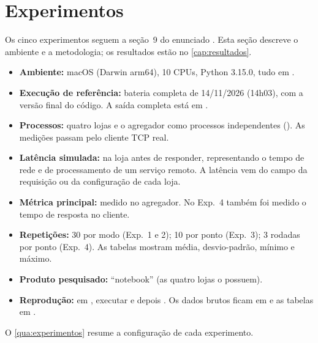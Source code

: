 \chapter{Experimentos}\label{cap:experimentos}

Os cinco experimentos seguem a seção~9 do enunciado \cite{enunciado2026}. Esta seção descreve o ambiente e a metodologia; os resultados estão no \autoref{cap:resultados}.

\begin{itemize}
  \item \textbf{Ambiente:} macOS (Darwin arm64), 10 CPUs, Python 3.15.0, tudo em .
  \item \textbf{Execução de referência:} bateria completa de 14/11/2026 (14h03), com a versão final do código. A saída completa está em .
  \item \textbf{Processos:} quatro lojas e o agregador como processos independentes (). As medições passam pelo cliente TCP real.
  \item \textbf{Latência simulada:}  na loja antes de responder, representando o tempo de rede e de processamento de um serviço remoto. A latência vem do campo  da requisição ou da configuração de cada loja.
  \item \textbf{Métrica principal:}  medido no agregador. No Exp.~4 também foi medido o tempo de resposta no cliente.
  \item \textbf{Repetições:} 30 por modo (Exp.~1 e 2); 10 por ponto (Exp.~3); 3 rodadas por ponto (Exp.~4). As tabelas mostram média, desvio-padrão, mínimo e máximo.
  \item \textbf{Produto pesquisado:} ``notebook'' (as quatro lojas o possuem).
  \item \textbf{Reprodução:} em , executar  e depois . Os dados brutos ficam em  e as tabelas em .
\end{itemize}

O \autoref{qua:experimentos} resume a configuração de cada experimento.

